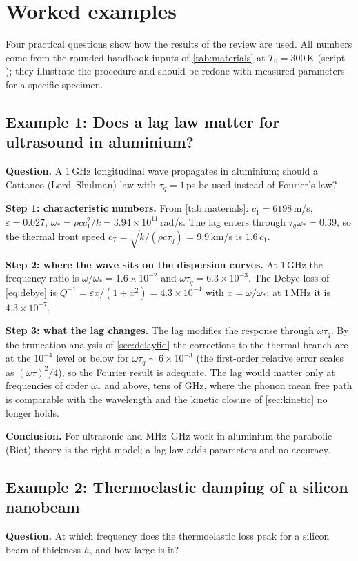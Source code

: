 \section{Worked examples}\label{sec:examples}

Four practical questions show how the results of the review are used. All numbers come from the rounded handbook inputs of \cref{tab:materials} at $T_0=300$\,K (script ); they illustrate the procedure and should be redone with measured parameters for a specific specimen.

\subsection{Example 1: Does a lag law matter for ultrasound in aluminium?}
\textbf{Question.} A 1\,GHz longitudinal wave propagates in aluminium; should a Cattaneo (Lord--Shulman) law with $\tau_q=1$\,ps be used instead of Fourier's law?

\textbf{Step 1: characteristic numbers.} From \cref{tab:materials}: $c_1=6198$\,m/s, $\varepsilon=0.027$, $\omega_*=\rho c c_1^2/k=3.94\times10^{11}$\,rad/s. The lag enters through $\tau_q\omega_*=0.39$, so the thermal front speed $c_T=\sqrt{k/(\rho c\tau_q)}=9.9$\,km/s is $1.6\,c_1$.

\textbf{Step 2: where the wave sits on the dispersion curves.} At $1$\,GHz the frequency ratio is $\omega/\omega_*=1.6\times10^{-2}$ and $\omega\tau_q=6.3\times10^{-3}$. The Debye loss of \cref{eq:debye} is $Q^{-1}=\varepsilon x/(1+x^2)=4.3\times10^{-4}$ with $x=\omega/\omega_*$; at $1$\,MHz it is $4.3\times10^{-7}$.

\textbf{Step 3: what the lag changes.} The lag modifies the response through $\omega\tau_q$. By the truncation analysis of \cref{sec:delayfid} the corrections to the thermal branch are at the $10^{-4}$ level or below for $\omega\tau_q\sim6\times10^{-3}$ (the first-order relative error scales as $(\omega\tau)^2/4$), so the Fourier result is adequate. The lag would matter only at frequencies of order $\omega_*$ and above, tens of GHz, where the phonon mean free path is comparable with the wavelength and the kinetic closure of \cref{sec:kinetic} no longer holds.

\textbf{Conclusion.} For ultrasonic and MHz--GHz work in aluminium the parabolic (Biot) theory is the right model; a lag law adds parameters and no accuracy.

\subsection{Example 2: Thermoelastic damping of a silicon nanobeam}
\textbf{Question.} At which frequency does the thermoelastic loss peak for a silicon beam of thickness $h$, and how large is it?

